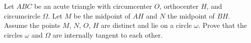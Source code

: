 Let $ABC$ be an acute triangle with circumcenter $O$,  orthocenter $H$,  and circumcircle $\Omega$. Let $M$ be the midpoint of $AH$ and $N$ the midpoint of $BH$. Assume the points $M$,  $N$,  $O$,  $H$ are distinct and lie on a circle $\omega$. Prove that the circles $\omega$ and $\Omega$ are internally tangent to each other.
